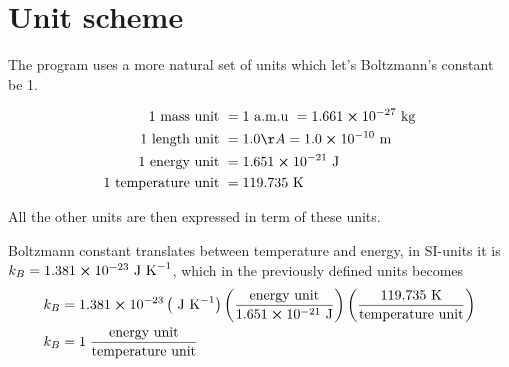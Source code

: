 \documentclass[11pt]{article}
\begin{document}
\appendix
	\section{Unit scheme}
		The program uses a more natural set of units which let's Boltzmann's constant be 1.

		\begin{align}
			1 \text{ mass unit } &= 1 \text{ a.m.u } = 1.661\cross 10^{-27} \text{ kg}
			\\
			1 \text{ length unit } &= 1.0 Å = 1.0\cross 10^{-10} \text{ m}
			\\
			1 \text{ energy unit } &= 1.651 \cross 10^{-21} \text{ J}
			\\
			1 \text{ temperature unit } &= 119.735 \text{ K}
		\end{align}


	All the other units are then expressed in term of these units.

	Boltzmann constant translates between temperature and energy, in SI-units it is \( k_B = 1.381 \cross 10^{-23} \text{ J K}^{-1}\), which in the previously defined units becomes
	\begin{align}
	k_B &= 1.381 \cross 10^{-23}  \left(\text{ J K}^{-1}\right)  \left(\frac{\text{energy unit}}{1.651 \cross 10^{-21} \text{ J}}\right)
	\left( \frac{119.735 \text{ K}}{\text{temperature unit}} \right)
	\\
	k_B &= 1 \; \frac{\text{energy unit}}{\text{temperature unit}}
	\end{align}







{}

		
\end{document}
